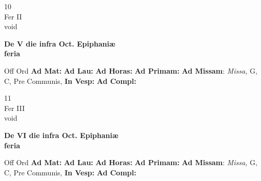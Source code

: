 \documentclass[10pt, openany]{book}
\begin{document}
    \begin{center}
        \begin{minipage}{3.5in}
            \vspace{2em}
            \begin{minipage}{0.5in}
                {\Huge 10} \\
                {\normalsize Fer II} \\
                {\normalsize void}
            \end{minipage}
            \begin{minipage}{3.0in}
                \textbf{ \large De V die infra Oct. Epiphaniæ \\
                \textnormal{\normalsize feria}} \\ 
            \end{minipage}
            \begin{justify}Off Ord
                \textbf{Ad Mat: }
                \textbf{Ad Lau: }
                \textbf{Ad Horas: }
                \textbf{Ad Primam: }\textbf{Ad Missam}: \textit{Missa,} G, C, Pre Communis,  
                \textbf{In Vesp: }
                \textbf{Ad Compl: }
            \end{justify}
        \end{minipage}
    \end{center}

    \begin{center}
        \begin{minipage}{3.5in}
            \vspace{2em}
            \begin{minipage}{0.5in}
                {\Huge 11} \\
                {\normalsize Fer III} \\
                {\normalsize void}
            \end{minipage}
            \begin{minipage}{3.0in}
                \textbf{ \large De VI die infra Oct. Epiphaniæ \\
                \textnormal{\normalsize feria}} \\ 
            \end{minipage}
            \begin{justify}Off Ord
                \textbf{Ad Mat: }
                \textbf{Ad Lau: }
                \textbf{Ad Horas: }
                \textbf{Ad Primam: }\textbf{Ad Missam}: \textit{Missa,} G, C, Pre Communis,  
                \textbf{In Vesp: }
                \textbf{Ad Compl: }
            \end{justify}
        \end{minipage}
    \end{center}
\end{document}
